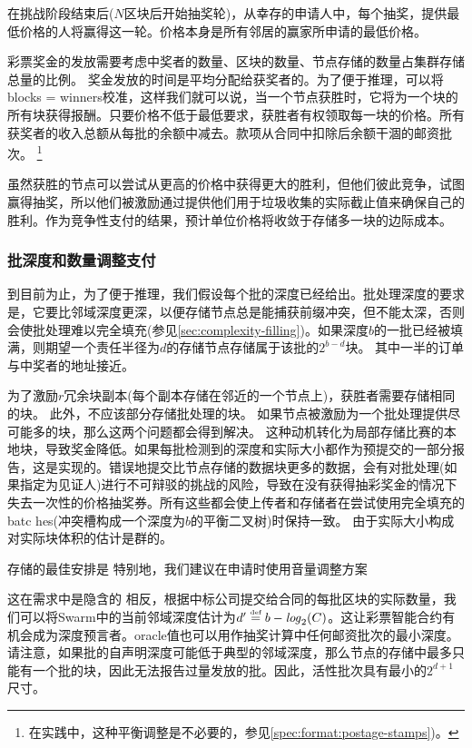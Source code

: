 在挑战阶段结束后($N$区块后开始抽奖轮)，从幸存的申请人中，每个抽奖，提供最低价格的人将赢得这一轮。价格本身是所有邻居的赢家所申请的最低价格。

彩票奖金的发放需要考虑中奖者的数量、区块的数量、节点存储的数量占集群存储总量的比例。
奖金发放的时间是平均分配给获奖者的。为了便于推理，可以将blocks = winners校准，这样我们就可以说，当一个节点获胜时，它将为一个块的所有块获得报酬。只要价格不低于最低要求，获胜者有权领取每一块的价格。所有获奖者的收入总额从每批的余额中减去。款项从合同中扣除后余额干涸的邮资批次。%
%
\footnote{在实践中，这种平衡调整是不必要的，参见\ref{spec:format:postage-stamps})。
}

虽然获胜的节点可以尝试从更高的价格中获得更大的胜利，但他们彼此竞争，试图赢得抽奖，所以他们被激励通过提供他们用于垃圾收集的实际截止值来确保自己的胜利。作为竞争性支付的结果，预计单位价格将收敛于存储多一块的边际成本。




\subsubsection{批深度和数量调整支付}

到目前为止，为了便于推理，我们假设每个批的深度已经给出。批处理深度的要求是，它要比邻域深度更深，以便存储节点总是能捕获前缀冲突，但不能太深，否则会使批处理难以完全填充(参见\ref{sec:complexity-filling})。如果深度$b$的一批已经被填满，则期望一个责任半径为$d$的存储节点存储属于该批的$2^{b-d}$块。
其中一半的订单与中奖者的地址接近。

为了激励$r$冗余块副本(每个副本存储在邻近的一个节点上)，获胜者需要存储相同的块。
此外，不应该部分存储批处理的块。
如果节点被激励为一个批处理提供尽可能多的块，那么这两个问题都会得到解决。
这种动机转化为局部存储比赛的本地块，导致奖金降低。如果每批检测到的深度和实际大小都作为预提交的一部分报告，这是实现的。错误地提交比节点存储的数据块更多的数据，会有对批处理(如果指定为见证人)进行不可辩驳的挑战的风险，导致在没有获得抽彩奖金的情况下失去一次性的价格抽奖券。所有这些都会使上传者和存储者在尝试使用完全填充的batc hes(冲突槽构成一个深度为$b$的平衡二叉树)时保持一致。
由于实际大小构成对实际块体积的估计是群的。

存储的最佳安排是
特别地，我们建议在申请时使用音量调整方案

这在需求中是隐含的
相反，根据中标公司提交给合同的每批区块的实际数量，我们可以将Swarm中的当前邻域深度估计为$d'\overset{\textrm{\tiny def}}{=} b - \mathit{log}_2(C)$。这让彩票智能合约有机会成为深度预言者。oracle值也可以用作抽奖计算中任何邮资批次的最小深度。请注意，如果批的自声明深度可能低于典型的邻域深度，那么节点的存储中最多只能有一个批的块，因此无法报告过量发放的批。因此，活性批次具有最小的$2^{d+1}$尺寸。


